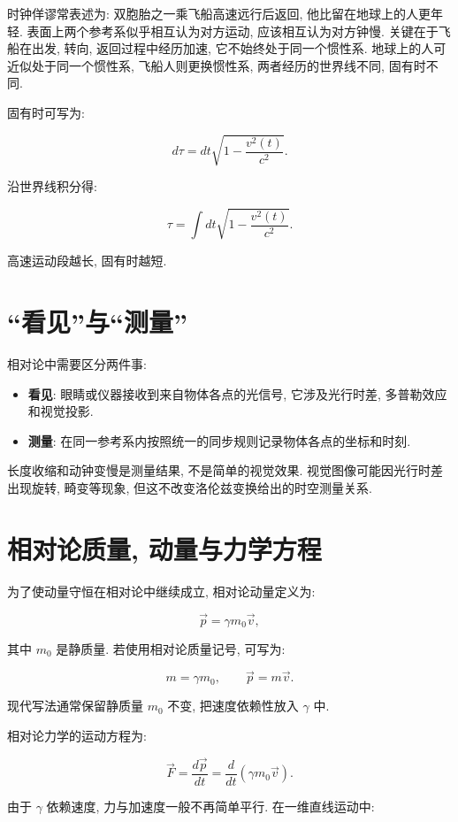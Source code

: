 \documentclass[
  a4paper,
]{ctexrep}
\providecommand{\tightlist}{%
  \setlength{\itemsep}{0pt}\setlength{\parskip}{0pt}}
\begin{document}
时钟佯谬常表述为: 双胞胎之一乘飞船高速远行后返回,
他比留在地球上的人更年轻. 表面上两个参考系似乎相互认为对方运动,
应该相互认为对方钟慢. 关键在于飞船在出发, 转向, 返回过程中经历加速,
它不始终处于同一个惯性系. 地球上的人可近似处于同一个惯性系,
飞船人则更换惯性系, 两者经历的世界线不同, 固有时不同.

固有时可写为:

\[
d\tau = dt\sqrt{1-\frac{v^2(t)}{c^2}}.
\]

沿世界线积分得:

\[
\tau = \int dt\sqrt{1-\frac{v^2(t)}{c^2}}.
\]

高速运动段越长, 固有时越短.

\section{``看见''与``测量''}\label{ux770bux89c1ux4e0eux6d4bux91cf}

相对论中需要区分两件事:

\begin{itemize}
\tightlist
\item
  \textbf{看见}: 眼睛或仪器接收到来自物体各点的光信号, 它涉及光行时差,
  多普勒效应和视觉投影.
\item
  \textbf{测量}:
  在同一参考系内按照统一的同步规则记录物体各点的坐标和时刻.
\end{itemize}

长度收缩和动钟变慢是测量结果, 不是简单的视觉效果.
视觉图像可能因光行时差出现旋转, 畸变等现象,
但这不改变洛伦兹变换给出的时空测量关系.

\section{相对论质量,
动量与力学方程}\label{ux76f8ux5bf9ux8bbaux8d28ux91cf-ux52a8ux91cfux4e0eux529bux5b66ux65b9ux7a0b}

为了使动量守恒在相对论中继续成立, 相对论动量定义为:

\[
\vec{p} = \gamma m_0 \vec{v},
\]

其中 \(m_0\) 是静质量. 若使用相对论质量记号, 可写为:

\[
m = \gamma m_0, \qquad \vec{p}=m\vec{v}.
\]

现代写法通常保留静质量 \(m_0\) 不变, 把速度依赖性放入 \(\gamma\) 中.

相对论力学的运动方程为:

\[
\vec{F} = \frac{d\vec{p}}{dt} = \frac{d}{dt}(\gamma m_0\vec{v}).
\]

由于 \(\gamma\) 依赖速度, 力与加速度一般不再简单平行. 在一维直线运动中:
\end{document}
